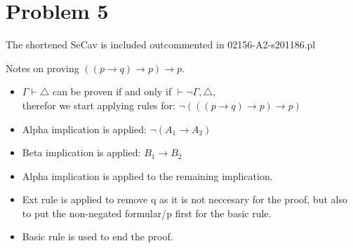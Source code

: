 \newpage
\section*{Problem 5}

The shortened SeCav is included outcommented in 02156-A2-s201186.pl

Notes on proving $((p \to q) \to p) \to p$.
\begin{itemize}
    \item $\Gamma \vdash \triangle$ can be proven if and only if $\vdash \neg \Gamma, \triangle$, \\ therefor we start applying rules for: $\neg(((p \to q) \to p) \to p)$  
    \item Alpha implication is applied: $\neg(A_1 \to A_2)$
    \item Beta implication is applied: $B_1 \to B_2$
    \item Alpha implication is applied to the remaining implication.
    \item Ext rule is applied to remove q as it is not neccesary for the proof, but also to put the non-negated formular/p first for the basic rule.
    \item Basic rule is used to end the proof.
\end{itemize}